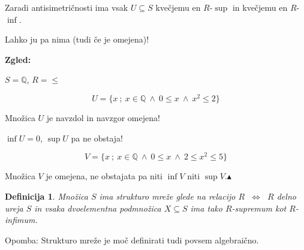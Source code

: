 \documentclass[11pt,paper=b5,footinclude,headinclude]{scrbook} %
\def\inn {{~\wedge~}}
\def\cee {{~\Leftrightarrow~}}
\def\zgled{\noindent\textbf{\color{blue} Zgled: }}
\def\kz{{\hfill{\color{blue}$\blacktriangle$}}}%
\newtheorem*{definicija}{Definicija}
\begin{document}
\bigskip

Zaradi antisimetričnosti ima vsak $U\subseteq S$ kvečjemu en $R$-$\sup$
in kvečjemu en $R$-$\inf$.

Lahko ju pa nima (tudi če je omejena)!

\bigskip
\zgled

$S = \mathbb{Q}$, $R = \le$

$$U = \{x~;~x\in \mathbb{Q}\inn 0\le x \inn x^2\le 2\}$$

Množica $U$ je navzdol in navzgor omejena!

$\inf U = 0$, $\sup U$ pa ne obstaja!

\medskip
$$V = \{x~;~x\in \mathbb{Q}\inn 0\le x \inn 2\le x^2\le 5\}$$

Množica $V$ je omejena, ne obstajata pa niti $\inf V$ niti $\sup V$.\kz

\begin{definicija}
Množica $S$ ima strukturo {\em mreže} glede na relacijo $R$ $\cee$
$R$ delno ureja $S$ in vsaka {\em dvoelementna} podmnožica $X\subseteq S$
ima tako $R$-supremum kot $R$-infimum.
\end{definicija}

\bigskip

Opomba: Strukturo mreže je moč definirati tudi povsem algebraično.

\bigskip
\end{document}
